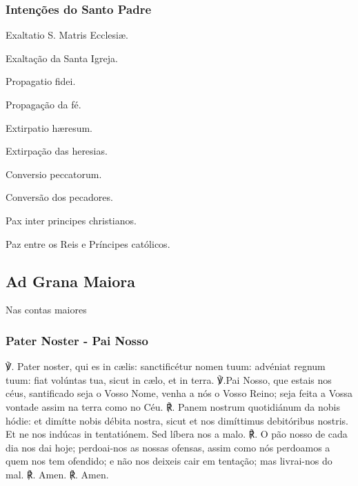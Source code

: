\subsubsection{Intenções do Santo Padre}
\begin{paracol}{2}
\begin{compactitem}
\item Exaltatio S. Matris Ecclesiæ.
\switchcolumn
\item Exaltação da Santa Igreja.
\switchcolumn*
\item Propagatio fidei.
\switchcolumn
\item Propagação da fé.
\switchcolumn*
\item Extirpatio hæresum.
\switchcolumn
\item Extirpação das heresias.
\switchcolumn*
\item Conversio peccatorum.
\switchcolumn
\item Conversão dos pecadores.
\switchcolumn*
\item Pax inter principes christianos.
\switchcolumn
\item Paz entre os Reis e Príncipes católicos.
\end{compactitem}
\end{paracol}

\emph{}

\subsection{Ad Grana Maiora}
\begin{nscenter}Nas contas maiores\end{nscenter}
\subsubsection{Pater Noster - Pai Nosso}
\begin{paracol}{2}
℣. Pater noster, qui es in cælis: sanctificétur nomen tuum: advéniat regnum tuum: fiat volúntas tua, sicut in cælo, et in terra.
\switchcolumn
℣.Pai Nosso, que estais nos céus, santificado seja o Vosso Nome, venha a nós o Vosso Reino; seja feita a Vossa vontade assim na terra como no Céu.
\switchcolumn*
℟. Panem nostrum quotidiánum da nobis hódie: et dimítte nobis débita nostra, sicut et nos dimíttimus debitóribus nostris. Et ne nos indúcas in tentatiónem. Sed líbera nos a malo.
\switchcolumn
℟. O pão nosso de cada dia nos dai hoje; perdoai-nos as nossas ofensas, assim como nós perdoamos a quem nos tem ofendido; e não nos deixeis cair em tentação; mas livrai-nos do mal.
\switchcolumn*
℟. Amen.
\switchcolumn
℟. Amen.
\end{paracol}


